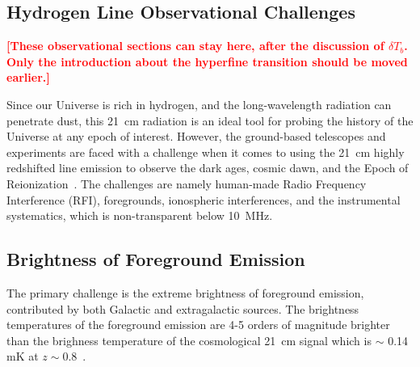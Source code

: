 \documentclass[12pt,a4paper]{report}
\newcommand{\attention}[1]{\textcolor{red}{\bf {#1}}}
\begin{document}
	
	\subsection{Hydrogen Line Observational Challenges}

\attention{[These observational sections can stay here, after the discussion of $\delta T_b$.  Only the introduction about the hyperfine transition should be moved earlier.]}
        
	Since our Universe is rich in hydrogen, and the long-wavelength radiation can penetrate dust, this \SI{21}{cm} radiation is an ideal tool for probing the history of the Universe at any epoch of interest. However, the ground-based telescopes and experiments are faced with a challenge when it comes to using the \SI{21}{cm} highly redshifted line emission to observe the dark ages, cosmic dawn, and the Epoch of Reionization~\citep{2016ExA....41..271R}. The challenges are namely human-made Radio Frequency Interference (RFI), foregrounds, ionospheric interferences, and the instrumental systematics, which is non-transparent below \SI{10}{MHz}. 
	
	\subsection*{Brightness of Foreground Emission}
	
	The	primary challenge is the extreme brightness of foreground emission, contributed by both Galactic and extragalactic sources.
	The brightness temperatures of the foreground emission are 4-5 orders of magnitude brighter than the brighness temperature of the cosmological \SI{21}{cm} signal which is $\sim$ 0.14 mK at $z\sim0.8$~\citep{2018RAA....18..114H}.
	
\end{document}
